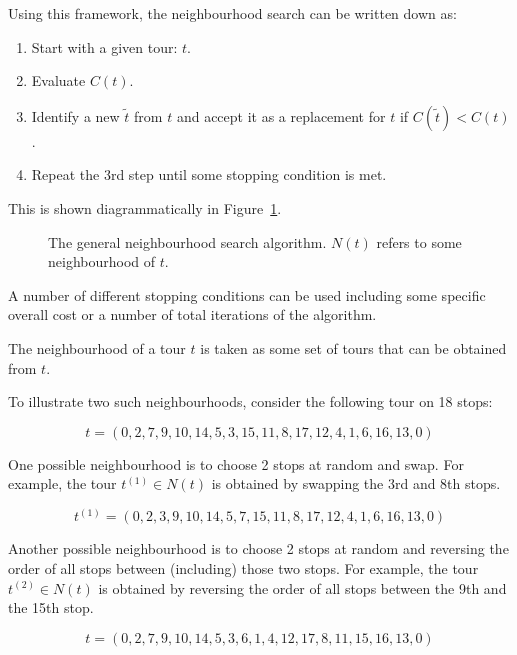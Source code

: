 Using this framework, the neighbourhood search can be written down as:

\begin{enumerate}
    \item Start with a given tour: \(t\).
    \item Evaluate \(C(t)\).
    \item Identify a new \(\tilde t\) from \(t\) and accept it as a replacement
        for \(t\) if \(C(\tilde t)<
        C(t)\).
    \item Repeat the 3rd step until some stopping condition is met.
\end{enumerate}

This is shown diagrammatically in Figure~\ref{fig:tsp}.

\begin{figure}[!hbtp]
    \begin{center}
        
    \end{center}
    \caption{The general neighbourhood search algorithm. \(N(t)\) refers to some
    neighbourhood of \(t\).}
    \label{fig:tsp}
\end{figure}

A number of different stopping conditions can be used including some specific
overall cost or a number of total iterations of the algorithm.

The neighbourhood of a tour \(t\) is taken as some set of tours that can be
obtained from \(t\).

To illustrate two such neighbourhoods, consider the following tour on 18 stops:

\[
    t = (0, 2, 7, 9, 10, 14, 5, 3, 15, 11, 8, 17, 12, 4, 1, 6, 16, 13, 0)
\]

One possible neighbourhood is to choose 2 stops at random and swap. For
example, the tour \(t^{(1)}\in N(t)\) is obtained by swapping the 3rd and 8th
stops.

\[
    t^{(1)} = (0, 2, 3, 9, 10, 14, 5, 7, 15, 11, 8, 17, 12, 4, 1, 6, 16, 13, 0)
\]

Another possible neighbourhood is to choose 2 stops at random and reversing the
order
of all stops between (including) those two stops. For example, the tour
\(t^{(2)} \in N(t)\) is obtained by reversing the order of all stops between
the 9th and the 15th stop.


\[
    t = (0, 2, 7, 9, 10, 14, 5, 3, 6, 1, 4, 12, 17, 8, 11, 15, 16, 13, 0)
\]

